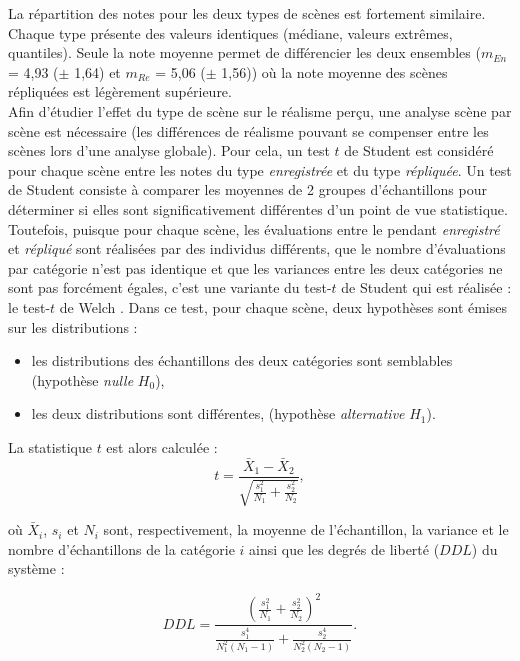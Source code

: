 {La répartition des notes pour les deux types de scènes est fortement similaire. Chaque type présente des valeurs identiques (médiane, valeurs extrêmes, quantiles). Seule la note moyenne permet de différencier les deux ensembles ($m_{En}$ = 4,93 ($\pm$ 1,64) et $m_{Re}$ = 5,06 ($\pm$ 1,56)) où la note moyenne des scènes répliquées est légèrement supérieure.\\

Afin d'étudier l'effet du type de scène sur le réalisme perçu, une analyse scène par scène est nécessaire (les différences de réalisme pouvant se compenser entre les scènes lors d'une analyse globale). Pour cela, un test $t$ de Student est considéré pour chaque scène entre les notes du type \textit{enregistrée} et du type \textit{répliquée}. Un test de Student consiste à comparer les moyennes de 2 groupes d'échantillons pour déterminer si elles sont significativement différentes d'un point de vue statistique. Toutefois, puisque pour chaque scène, les évaluations entre le pendant \textit{enregistré} et \textit{répliqué} sont réalisées par des individus différents, que le nombre d'évaluations par catégorie n'est pas identique et que les variances entre les deux catégories ne sont pas forcément égales, c'est une variante du test-$t$ de Student qui est réalisée : le test-$t$ de Welch \cite{ruxton2006unequal}. Dans ce test, pour chaque scène, deux hypothèses sont émises sur les distributions :

\begin{itemize}
\item les distributions des échantillons des deux catégories sont semblables (hypothèse \textit{nulle} $H_0$),
\item les deux distributions sont différentes, (hypothèse \textit{alternative} $H_1$).\\
\end{itemize}

La statistique $t$ est alors calculée :
\begin{equation}
t = \frac{\bar{X}_1-\bar{X}_2}{\sqrt{\frac{s_1^2}{N_1}+\frac{s_2^2}{N_2}}},
\end{equation}

où $\bar{X}_i$, $s_i$ et $N_i$ sont, respectivement, la moyenne de l'échantillon, la variance et le nombre d'échantillons de la catégorie $i$ ainsi que les degrés de liberté ($DDL$) du système :  

\begin{equation}
DDL = \frac{\left(\frac{s_1^2}{N_1}+\frac{s_2^2}{N_2} \right)^2}{\frac{s_1^4}{N_1^2(N_1-1)}+\frac{s_2^4}{N_2^2(N_2-1)}}.
\end{equation}

}
